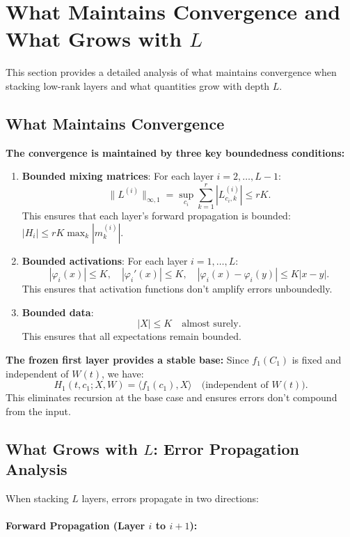 \section{What Maintains Convergence and What Grows with $L$}
\label{sec:convergence-analysis-L}

This section provides a detailed analysis of what maintains convergence when stacking low-rank layers and what quantities grow with depth $L$.

\subsection{What Maintains Convergence}

\textbf{The convergence is maintained by three key boundedness conditions:}

\begin{enumerate}
\item \textbf{Bounded mixing matrices}: For each layer $i = 2, \ldots, L-1$:
\[
\|L^{(i)}\|_{\infty,1} = \sup_{c_i}\sum_{k=1}^r |L^{(i)}_{c_i,k}| \le rK.
\]
This ensures that each layer's forward propagation is bounded: $|H_i| \le rK \max_k |m_k^{(i)}|$.

\item \textbf{Bounded activations}: For each layer $i = 1, \ldots, L$:
\[
|\varphi_i(x)| \le K, \quad |\varphi_i'(x)| \le K, \quad |\varphi_i(x) - \varphi_i(y)| \le K|x-y|.
\]
This ensures that activation functions don't amplify errors unboundedly.

\item \textbf{Bounded data}: 
\[
|X| \le K \quad \text{almost surely}.
\]
This ensures that all expectations remain bounded.
\end{enumerate}

\textbf{The frozen first layer provides a stable base:} Since $f_1(C_1)$ is fixed and independent of $W(t)$, we have:
\[
H_1(t, c_1; X, W) = \langle f_1(c_1), X\rangle \quad \text{(independent of $W(t)$)}.
\]
This eliminates recursion at the base case and ensures errors don't compound from the input.

\subsection{What Grows with $L$: Error Propagation Analysis}

When stacking $L$ layers, errors propagate in two directions:

\paragraph*{Forward Propagation (Layer $i$ to $i+1$):}

